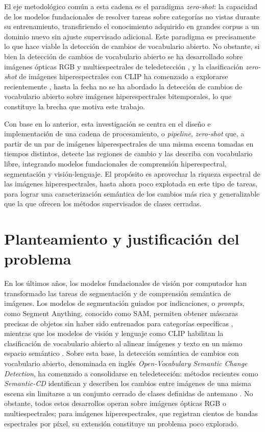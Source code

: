 \documentclass[12pt,onecolumn]{IEEEtran}
\begin{document}
El eje metodológico común a esta cadena es el paradigma \textit{zero-shot}: la capacidad de los modelos fundacionales de resolver tareas sobre categorías no vistas durante su entrenamiento, transfiriendo el conocimiento adquirido en grandes corpus a un dominio nuevo sin ajuste supervisado adicional. Este paradigma es precisamente lo que hace viable la detección de cambios de vocabulario abierto. No obstante, si bien la detección de cambios de vocabulario abierto se ha desarrollado sobre imágenes ópticas RGB y multiespectrales de teledetección \cite{zhu2025semanticcd}, y la clasificación \textit{zero-shot} de imágenes hiperespectrales con CLIP ha comenzado a explorarse recientemente \cite{pang2025special}, hasta la fecha no se ha abordado la detección de cambios de vocabulario abierto sobre imágenes hiperespectrales bitemporales, lo que constituye la brecha que motiva este trabajo.

Con base en lo anterior, esta investigación se centra en el diseño e implementación de una cadena de procesamiento, o \textit{pipeline}, \textit{zero-shot} que, a partir de un par de imágenes hiperespectrales de una misma escena tomadas en tiempos distintos, detecte las regiones de cambio y las describa con vocabulario libre, integrando modelos fundacionales de comprensión hiperespectral, segmentación y visión-lenguaje. El propósito es aprovechar la riqueza espectral de las imágenes hiperespectrales, hasta ahora poco explotada en este tipo de tareas, para lograr una caracterización semántica de los cambios más rica y generalizable que la que ofrecen los métodos supervisados de clases cerradas.

\newpage
\section{\textbf{Planteamiento y justificación del problema}}


En los últimos años, los modelos fundacionales de visión por computador han transformado las tareas de segmentación y de comprensión semántica de imágenes. Los modelos de segmentación guiados por indicaciones, o \textit{prompts}, como Segment Anything, conocido como SAM, permiten obtener máscaras precisas de objetos sin haber sido entrenados para categorías específicas \cite{kirillov2023sam}, mientras que los modelos de visión y lenguaje como CLIP habilitan la clasificación de vocabulario abierto al alinear imágenes y texto en un mismo espacio semántico \cite{radford2021clip}. Sobre esta base, la detección semántica de cambios con vocabulario abierto, denominada en inglés \textit{Open-Vocabulary Semantic Change Detection}, ha comenzado a consolidarse en teledetección: métodos recientes como \textit{Semantic-CD} identifican y describen los cambios entre imágenes de una misma escena sin limitarse a un conjunto cerrado de clases definidas de antemano \cite{zhu2025semanticcd}. No obstante, todos estos desarrollos operan sobre imágenes ópticas RGB o multiespectrales; para imágenes hiperespectrales, que registran cientos de bandas espectrales por píxel, su extensión constituye un problema poco explorado.
\end{document}

